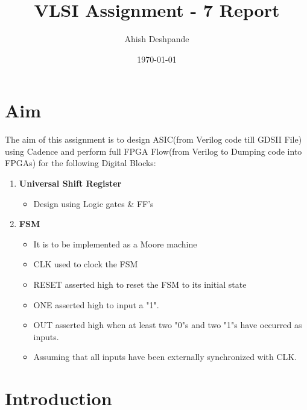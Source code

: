 \documentclass[a4paper,10pt]{report}
\begin{document}
\title{VLSI Assignment - 7 Report}
\author{Ahish Deshpande}
\date{\today}
\maketitle


\tableofcontents

\newpage

\renewcommand\thesection{\arabic{section}}
\section{Aim}

The aim of this assignment is to design ASIC(from Verilog code till GDSII File) using Cadence and perform full FPGA Flow(from Verilog to Dumping code into FPGAs) for the following Digital Blocks:
\begin{enumerate}

	\item \textbf{Universal Shift Register}
		\begin{itemize}
			\item Design using Logic gates \& FF's
		\end{itemize}

	\item \textbf{FSM}
		\begin{itemize}
			\item It is to be implemented as a Moore machine
			\item CLK used to clock the FSM
			\item RESET asserted high to reset the FSM to its initial state
			\item ONE asserted high to input a "1".
			\item OUT asserted high when at least two "0"s and two "1"s have occurred as inputs. 
			\item Assuming that all inputs have been externally synchronized with CLK.
		\end{itemize}

\end{enumerate}

\section{Introduction}
\end{document}
